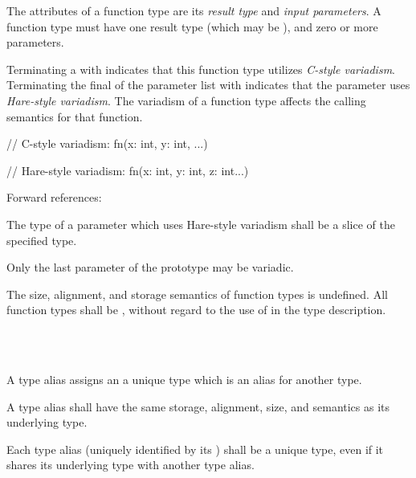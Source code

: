 \specsubsubitem
The attributes of a function type are its \textit{result type} and
\textit{input parameters}. A function type must have one result type (which may
be ), and zero or more parameters.

\specsubsubitem
Terminating a  with  indicates that
this function type utilizes \textit{C-style variadism}. Terminating the final
 of the parameter list with  indicates
that the parameter uses \textit{Hare-style variadism}. The variadism of a
function type affects the calling semantics for that function.

\begin{codesample}
// C-style variadism:
fn(x: int, y: int, ...)

// Hare-style variadism:
fn(x: int, y: int, z: int...)
\end{codesample}

Forward references: 

\specsubsubitem
The type of a parameter which uses Hare-style variadism shall be a
 slice of the specified type.


\specsubsubitem
Only the last parameter of the prototype may be variadic.

\specsubsubitem
The size, alignment, and storage semantics of function types is undefined. All
function types shall be , without regard to the use of
 in the type description.


\begin{grammar}
 \\
	 \\
\end{grammar}

\specsubsubitem
A type alias assigns an  a unique type which is an
alias for another type.


\specsubsubitem
A type alias shall have the same storage, alignment, size, and semantics as its
underlying type.

\specsubsubitem
Each type alias (uniquely identified by its ) shall be
a unique type, even if it shares its underlying type with another type alias.

